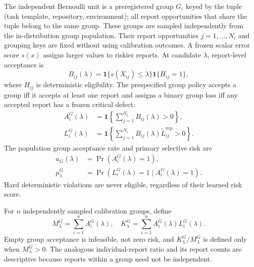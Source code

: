The independent Bernoulli unit is a preregistered group $G_i$ keyed by the
tuple (task template, repository, environment); all report opportunities that
share the tuple belong to the same group. These groups are sampled independently
from the in-distribution group population. Their report opportunities
$j=1,\ldots,N_i$ and grouping keys are fixed without using calibration outcomes.
A frozen scalar error score $s(x)$ assigns larger values to riskier reports. At
candidate $\lambda$, report-level acceptance is
\begin{equation}
    B_{ij}(\lambda)=
    \mathbf{1}\{s(X_{ij})\leq\lambda\}\mathbf{1}\{H_{ij}=1\},
\end{equation}
where $H_{ij}$ is deterministic eligibility. The prespecified group policy
accepts a group iff it accepts at least one report and assigns a binary group
loss iff any accepted report has a frozen critical defect:
\begin{align}
    A_i^{G}(\lambda)
        &=\mathbf{1}\!\left\{\sum_{j=1}^{N_i}B_{ij}(\lambda)>0\right\},\\
    L_i^{G}(\lambda)
        &=\mathbf{1}\!\left\{\sum_{j=1}^{N_i}
          B_{ij}(\lambda)\widetilde L_{ij}^{\mathrm{rep}}>0\right\}.
\end{align}
The population group acceptance rate and primary selective risk are
\begin{align}
    a_G(\lambda) &= \Pr(A_i^G(\lambda)=1),\\
    p_\lambda^G &=
    \Pr(L_i^G(\lambda)=1\mid A_i^G(\lambda)=1).
\end{align}
Hard deterministic violations are never eligible, regardless of their learned
risk score.

For $n$ independently sampled calibration groups, define
\begin{equation}
    M_\lambda^G=\sum_{i=1}^{n}A_i^G(\lambda),\quad
    K_\lambda^G=\sum_{i=1}^{n}A_i^G(\lambda)L_i^G(\lambda).
\end{equation}
Empty group acceptance is infeasible, not zero risk, and
$K_\lambda^G/M_\lambda^G$ is defined only when $M_\lambda^G>0$. The analogous
individual-report ratio and its report counts are descriptive because reports
within a group need not be independent.

